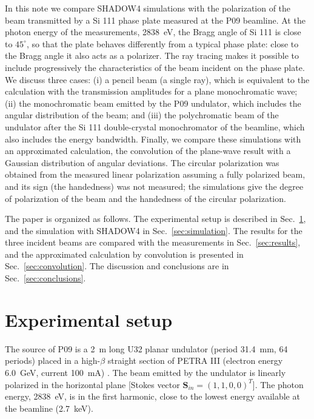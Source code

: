 \documentclass{iucr}
\begin{document}
In this note we compare SHADOW4 simulations with the polarization of the beam transmitted by a Si 111 phase plate measured at the P09 beamline. At the photon energy of the measurements, 2838~eV, the Bragg angle of Si 111 is close to $45^\circ$, so that the plate behaves differently from a typical phase plate: close to the Bragg angle it also acts as a polarizer. The ray tracing makes it possible to include progressively the characteristics of the beam incident on the phase plate. We discuss three cases: (i) a pencil beam (a single ray), which is equivalent to the calculation with the transmission amplitudes for a plane monochromatic wave; (ii) the monochromatic beam emitted by the P09 undulator, which includes the angular distribution of the beam; and (iii) the polychromatic beam of the undulator after the Si 111 double-crystal monochromator of the beamline, which also includes the energy bandwidth. Finally, we compare these simulations with an approximated calculation, the convolution of the plane-wave result with a Gaussian distribution of angular deviations. The circular polarization was obtained from the measured linear polarization assuming a fully polarized beam, and its sign (the handedness) was not measured; the simulations give the degree of polarization of the beam and the handedness of the circular polarization.

The paper is organized as follows. The experimental setup is described in Sec.~\ref{sec:experiment}, and the simulation with SHADOW4 in Sec.~\ref{sec:simulation}. The results for the three incident beams are compared with the measurements in Sec.~\ref{sec:results}, and the approximated calculation by convolution is presented in Sec.~\ref{sec:convolution}. The discussion and conclusions are in Sec.~\ref{sec:conclusions}.


\section{Experimental setup}
\label{sec:experiment}

The source of P09 is a 2~m long U32 planar undulator (period 31.4~mm, 64 periods) placed in a high-$\beta$ straight section of PETRA III (electron energy 6.0~GeV, current 100~mA) \cite{Strempfer2013}. The beam emitted by the undulator is linearly polarized in the horizontal plane [Stokes vector $\mathbf{S}_{in}=(1,1,0,0)^T$]. The photon energy, 2838~eV, is in the first harmonic, close to the lowest energy available at the beamline (2.7~keV).
\end{document}
